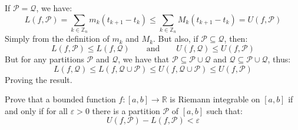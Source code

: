 \documentclass[crop=false,class=article]{standalone}                       %
\begin{document}
    \begin{solution}
        If $\mathcal{P}=\mathcal{Q}$, we have:
        \begin{equation}
                L(f,\mathcal{P})
                =\sum_{k\in\mathbb{Z}_{n}}m_{k}(t_{k+1}-t_{k})
                \leq\sum_{k\in\mathbb{Z}_{n}}M_{k}(t_{k+1}-t_{k})
                =U(f,\mathcal{P})
        \end{equation}
        Simply from the definition of $m_{k}$ and $M_{k}$. But also, if
        $\mathcal{P}\subseteq\mathcal{Q}$, then:
        \begin{equation}
            L(f,\mathcal{P})\leq{L}(f,\mathcal{Q})
            \quad\quad
            \textrm{and}
            \quad\quad
            U(f,\mathcal{Q})\leq{U}(f,\mathcal{P})
        \end{equation}
        But for any partitions $\mathcal{P}$ and $\mathcal{Q}$, we have
        that $\mathcal{P}\subseteq\mathcal{P}\cup\mathcal{Q}$ and
        $\mathcal{Q}\subseteq\mathcal{P}\cup\mathcal{Q}$, thus:
        \begin{equation}
            L(f,\mathcal{Q})\leq{L}(f,\mathcal{Q}\cup\mathcal{P})
            \leq{U}(f,\mathcal{Q}\cup\mathcal{P})
            \leq{U}(f,\mathcal{P})
        \end{equation}
        Proving the result.
    \end{solution}
    \begin{problem}
        Prove that a bounded function $f:[a,b]\rightarrow\mathbb{R}$ is
        Riemann integrable on $[a,b]$ if and only if for all
        $\varepsilon>0$ there is a partition $\mathcal{P}$ of $[a,b]$ such
        that:
        \begin{equation}
            U(f,\mathcal{P})-L(f,\mathcal{P})<\varepsilon
        \end{equation}
    \end{problem}
\end{document}
